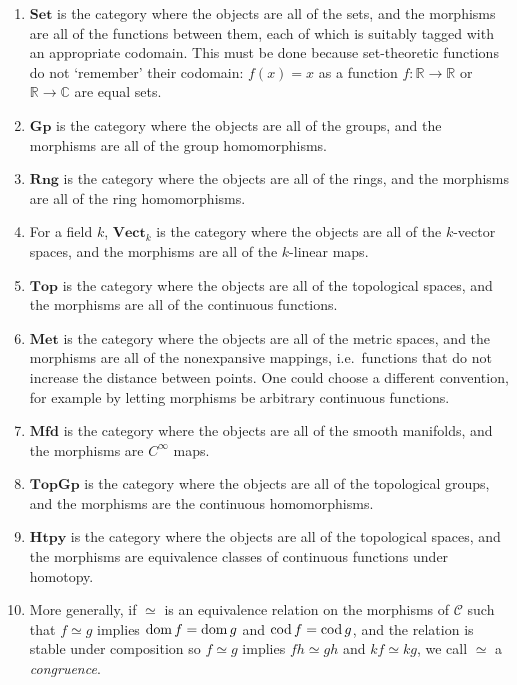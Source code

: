 \begin{example}
    \begin{enumerate}
        \item \( \mathbf{Set} \) is the category where the objects are all of the sets, and the morphisms are all of the functions between them, each of which is suitably tagged with an appropriate codomain.
        This must be done because set-theoretic functions do not `remember' their codomain: \( f(x) = x \) as a function \( f : \mathbb R \to \mathbb R \) or \( \mathbb R \to \mathbb C \) are equal sets.
        \item \( \mathbf{Gp} \) is the category where the objects are all of the groups, and the morphisms are all of the group homomorphisms.
        \item \( \mathbf{Rng} \) is the category where the objects are all of the rings, and the morphisms are all of the ring homomorphisms.
        \item For a field \( k \), \( \mathbf{Vect}_k \) is the category where the objects are all of the \( k \)-vector spaces, and the morphisms are all of the \( k \)-linear maps.
        \item \( \mathbf{Top} \) is the category where the objects are all of the topological spaces, and the morphisms are all of the continuous functions.
        \item \( \mathbf{Met} \) is the category where the objects are all of the metric spaces, and the morphisms are all of the nonexpansive mappings, i.e.\ functions that do not increase the distance between points.
        One could choose a different convention, for example by letting morphisms be arbitrary continuous functions.
        \item \( \mathbf{Mfd} \) is the category where the objects are all of the smooth manifolds, and the morphisms are \( C^\infty \) maps.
        \item \( \mathbf{TopGp} \) is the category where the objects are all of the topological groups, and the morphisms are the continuous homomorphisms.
        \item \( \mathbf{Htpy} \) is the category where the objects are all of the topological spaces, and the morphisms are equivalence classes of continuous functions under homotopy.
        \item More generally, if \( \simeq \) is an equivalence relation on the morphisms of \( \mathcal C \) such that \( f \simeq g \) implies \( \operatorname{dom} f = \operatorname{dom} g \) and \( \operatorname{cod} f = \operatorname{cod} g \), and the relation is stable under composition so \( f \simeq g \) implies \( fh \simeq gh \) and \( kf \simeq kg \), we call \( \simeq \) a \emph{congruence}.

\end{enumerate}
\end{example}
